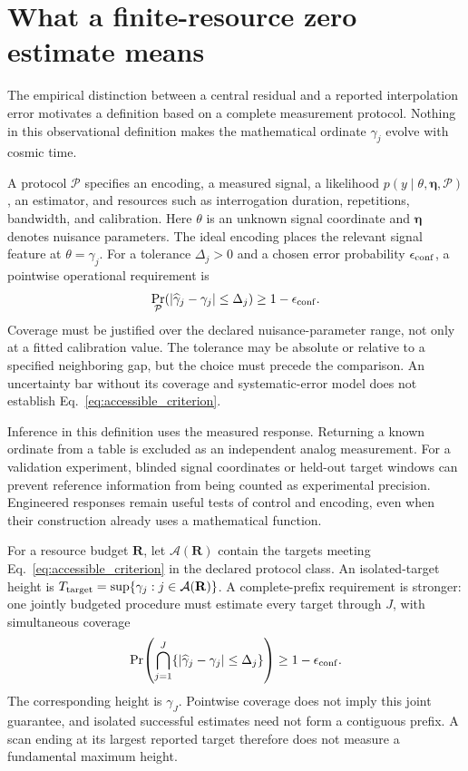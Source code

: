 \section{What a finite-resource zero estimate means}
\label{sec:operational}

The empirical distinction between a central residual and a reported
interpolation error motivates a definition based on a complete measurement
protocol. Nothing in this observational definition makes the mathematical
ordinate $\gamma_j$ evolve with cosmic time.

A protocol $\mathcal P$ specifies an encoding, a measured signal, a likelihood
$p(y\mid\theta,\boldsymbol\eta,\mathcal P)$, an estimator, and resources
such as interrogation duration, repetitions, bandwidth, and calibration.
Here $\theta$ is an unknown signal coordinate and $\boldsymbol\eta$ denotes
nuisance parameters. The ideal encoding places the relevant signal feature
at $\theta=\gamma_j$. For a tolerance $\Delta_j>0$ and a chosen error
probability $\epsilon_{\rm conf}$, a pointwise operational requirement is
\begin{equation}
 \Pr_{\mathcal P}\!\left(
   |\widehat\gamma_j-\gamma_j|\leq\Delta_j
 \right)\geq 1-\epsilon_{\rm conf}.
 \label{eq:accessible_criterion}
\end{equation}
Coverage must be justified over the declared nuisance-parameter range, not
only at a fitted calibration value. The tolerance may be absolute or relative
to a specified neighboring gap, but the choice must precede the comparison.
An uncertainty bar without its coverage and systematic-error model does not
establish Eq.~\eqref{eq:accessible_criterion}.

Inference in this definition uses the measured response. Returning a known
ordinate from a table is excluded as an independent analog measurement.
For a validation experiment, blinded signal coordinates or held-out target
windows can prevent reference information from being counted as experimental
precision. Engineered responses remain useful tests of control and encoding,
even when their construction already uses a mathematical function.

For a resource budget $\mathbf R$, let $\mathcal A(\mathbf R)$ contain the
targets meeting Eq.~\eqref{eq:accessible_criterion} in the declared protocol
class. An isolated-target height is
$T_{\rm target}=\sup\{\gamma_j:j\in\mathcal A(\mathbf R)\}$.
A complete-prefix requirement is stronger: one jointly budgeted procedure
must estimate every target through $J$, with simultaneous coverage
\begin{equation}
 \Pr\!\left(\bigcap_{j=1}^{J}
  \{|\widehat\gamma_j-\gamma_j|\leq\Delta_j\}\right)
 \geq1-\epsilon_{\rm conf}.
 \label{eq:prefix_coverage}
\end{equation}
The corresponding height is $\gamma_J$. Pointwise coverage does not imply
this joint guarantee, and isolated successful estimates need not form a
contiguous prefix. A scan ending at its largest reported target therefore
does not measure a fundamental maximum height.

